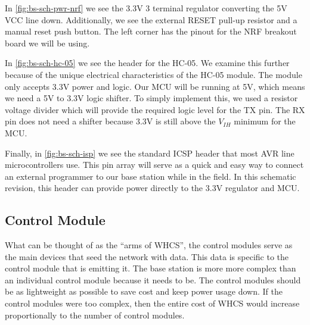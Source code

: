 
In \autoref{fig:bs-sch-pwr-nrf} we see the 3.3V 3 terminal regulator converting the
5V VCC line down. Additionally, we see the external RESET pull-up resistor and
a manual reset push button. The left corner has the pinout for the NRF breakout
board we will be using.


In \autoref{fig:bs-sch-hc-05} we see the header for the HC-05. We examine this
further because of the unique electrical characteristics of the HC-05 module.
The module only accepts 3.3V power and logic. Our MCU will be running at 5V,
which means we need a 5V to 3.3V logic shifter. To simply implement this, we
used a resistor voltage divider which will provide the required logic level for
the TX pin. The RX pin does not need a shifter because 3.3V is still above the
$V_{IH}$ minimum for the MCU.


Finally, in \autoref{fig:bs-sch-isp} we see the standard ICSP header that most
AVR line microcontrollers use. This pin array will serve as a quick and easy
way to connect an external programmer to our base station while in the field.
In this schematic revision, this header can provide power directly to the 3.3V
regulator and MCU.



\subsection{Control Module}
What can be thought of as the ``arms of WHCS'', the control modules serve as
the main devices that seed the network with data. This data is specific to the
control module that is emitting it. The base station is more more complex than
an individual control module because it needs to be. The control modules should
be as lightweight as possible to save cost and keep power usage down. If the
control modules were too complex, then the entire cost of WHCS would increase
proportionally to the number of control modules.


